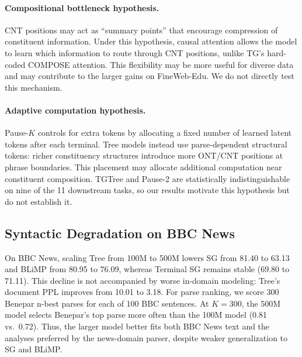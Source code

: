 \documentclass[11pt]{article}
\begin{document}
\paragraph{Compositional bottleneck hypothesis.} CNT positions may act as ``summary points'' that encourage compression of constituent information. Under this hypothesis, causal attention allows the model to learn which information to route through CNT positions, unlike TG's hard-coded COMPOSE attention. This flexibility may be more useful for diverse data and may contribute to the larger gains on FineWeb-Edu. We do not directly test this mechanism.

\paragraph{Adaptive computation hypothesis.} Pause-$K$ controls for extra tokens by allocating a fixed number of learned latent tokens after each terminal. Tree models instead use parse-dependent structural tokens: richer constituency structures introduce more ONT/CNT positions at phrase boundaries. This placement may allocate additional computation near constituent composition. TGTree and Pause-2 are statistically indistinguishable on nine of the 11 downstream tasks, so our results motivate this hypothesis but do not establish it.


\subsection{Syntactic Degradation on BBC News}
\label{sec:sg-discussion}

On BBC News, scaling Tree from 100M to 500M lowers SG from 81.40 to 63.13 and BLiMP from 80.95 to 76.09, whereas Terminal SG remains stable (69.80 to 71.11). This decline is not accompanied by worse in-domain modeling: Tree's document PPL improves from 10.01 to 3.18. For parse ranking, we score 300 Benepar n-best parses for each of 100 BBC sentences. At $K=300$, the 500M model selects Benepar's top parse more often than the 100M model (0.81 vs.\ 0.72). Thus, the larger model better fits both BBC News text and the analyses preferred by the news-domain parser, despite weaker generalization to SG and BLiMP.
\end{document}

